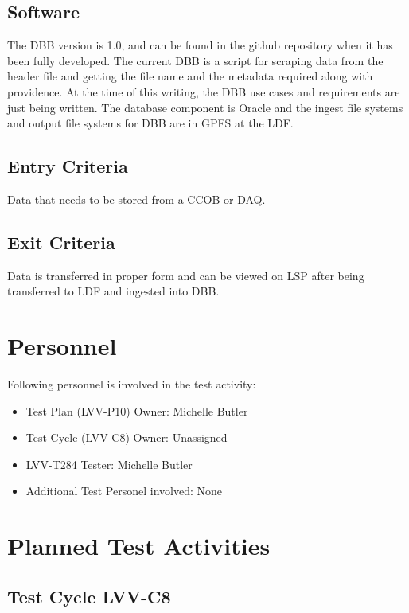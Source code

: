 \documentclass[DM,lsstdraft,STR,toc]{lsstdoc}
\begin{document}
\subsection{Software}
\label{sect:swconf}

The DBB version is 1.0, and can be found in the github repository when it has been fully developed.   The current DBB is a script for scraping data from the header file and getting the file name and the metadata required along with providence.   At the time of this writing, the DBB use cases and requirements are just being written.    The database component is Oracle and the ingest file systems and output file systems for DBB are in GPFS at the LDF.  

\subsection{Entry Criteria}

Data that needs to be stored from a CCOB or DAQ.

\subsection{Exit Criteria}

Data is transferred in proper form and can be viewed on LSP after being transferred to LDF and ingested into DBB.  


\section{Personnel}
\label{sect:personnel}

Following personnel is involved in the test activity:

\begin{itemize}
\item Test Plan (LVV-P10) Owner: Michelle Butler
\item Test Cycle (LVV-C8) Owner: Unassigned
\item LVV-T284 Tester: Michelle Butler
\item Additional Test Personel involved: None 
\end{itemize}

\newpage


\section{Planned Test Activities}
\label{sect:plannedtestactivities}

\subsection{Test Cycle LVV-C8}
\end{document}
